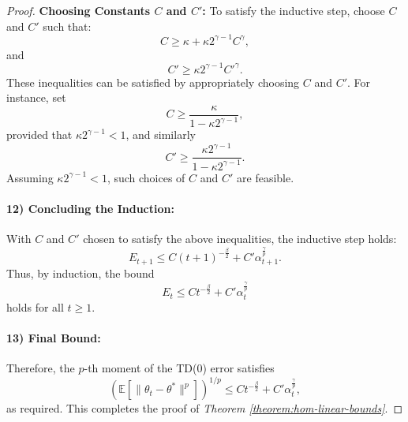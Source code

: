 \begin{proof}
\textbf{Choosing Constants \( C \) and \( C' \):}  
To satisfy the inductive step, choose \( C \) and \( C' \) such that:
\[
C \geq \kappa + \kappa 2^{\gamma - 1} C^{\gamma},
\]
and
\[
C' \geq \kappa 2^{\gamma - 1} C'^{\gamma}.
\]
These inequalities can be satisfied by appropriately choosing \( C \) and \( C' \). For instance, set
\[
C \geq \frac{\kappa}{1 - \kappa 2^{\gamma - 1}},
\]
provided that \( \kappa 2^{\gamma - 1} < 1 \), and similarly
\[
C' \geq \frac{\kappa 2^{\gamma - 1}}{1 - \kappa 2^{\gamma - 1}}.
\]
Assuming \( \kappa 2^{\gamma - 1} < 1 \), such choices of \( C \) and \( C' \) are feasible.

\paragraph{12) Concluding the Induction:}  
With \( C \) and \( C' \) chosen to satisfy the above inequalities, the inductive step holds:
\[
E_{t+1} \leq C (t+1)^{-\tfrac{\beta}{2}} + C' \alpha_{t+1}^{\tfrac{\gamma}{p}}.
\]
Thus, by induction, the bound
\[
E_t \leq C t^{-\tfrac{\beta}{2}} + C' \alpha_t^{\tfrac{\gamma}{p}}
\]
holds for all \( t \geq 1 \).

\paragraph{13) Final Bound:}  
Therefore, the \( p \)-th moment of the TD(0) error satisfies
\[
\left( \mathbb{E}\left[\|\theta_t - \theta^*\|^p\right] \right)^{1/p} \leq C t^{-\tfrac{\beta}{2}} + C' \alpha_t^{\tfrac{\gamma}{p}},
\]
as required. This completes the proof of \emph{Theorem \ref{theorem:hom-linear-bounds}}.
\end{proof}